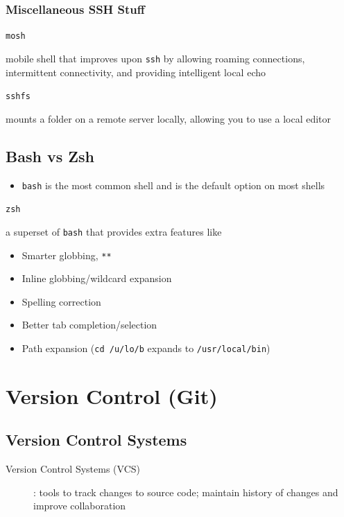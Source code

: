 \documentclass[letterpaper,12pt]{article}
\newcommand*{\lstitem}[1]{
  \setbox0\hbox{\lstinline{#1}}
  \item[\usebox0]
}
\begin{document}
\subsubsection{Miscellaneous SSH Stuff}

\begin{description}
 \lstitem{mosh} mobile shell that improves upon \lstinline{ssh} by allowing roaming connections, intermittent connectivity, and providing intelligent local echo
 \lstitem{sshfs} mounts a folder on a remote server locally, allowing you to use a local editor
\end{description}

\subsection{Bash vs Zsh}
\begin{itemize}
 \item \lstinline{bash} is the most common shell and is the default option on most shells
\end{itemize}

\begin{description}
 \lstitem{zsh} a superset of \lstinline{bash} that provides extra features like
\end{description}

\begin{itemize}
 \item Smarter globbing, \lstinline{**}
 \item Inline globbing/wildcard expansion
 \item Spelling correction
 \item Better tab completion/selection
 \item Path expansion (\lstinline{cd /u/lo/b} expands to \lstinline{/usr/local/bin})
\end{itemize}

\section{Version Control (Git)}

\subsection{Version Control Systems}
\begin{description}
 \item[Version Control Systems (VCS)]: tools to track changes to source code; maintain history of changes and improve collaboration
\end{description}
\end{document}
